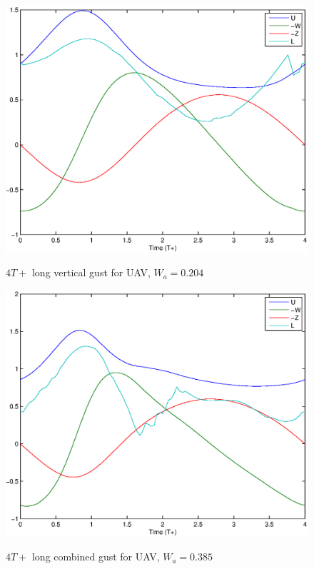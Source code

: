 \begin{figure}[h]
	\begin{center}
		\scalebox{0.8}
		{\includegraphics{./Figures/Windtype=1_Tg=4_Wg=0p204_UAV_alphamax=12.eps}}
	\end{center}
	\caption{$4T+$ long vertical gust for UAV, $W_a=0.204$}
	\label{fig:vertical_optimization_UAV}
\end{figure}


\begin{figure}[h]
	\begin{center}
		\scalebox{0.8}
		{\includegraphics{./Figures/Windtype=3_Tg=4_Wg=0p385_UAV_alphamax=12.eps}}
	\end{center}
	\caption{$4T+$ long combined gust for UAV, $W_a=0.385$}
	\label{fig:combined_optimization_UAV}
\end{figure}

